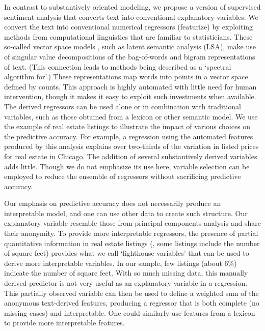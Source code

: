 \documentclass[12pt]{article}
\begin{document}
 In contrast to substantively oriented modeling, we propose a version of supervised
 sentiment analysis that converts text into conventional explanatory variables.
 We convert the text into conventional numerical regressors (featurize) by exploiting methods from computational linguistics that are familiar to statisticians. These so-called vector space models \citep{turney10}, such as latent semantic analysis (LSA), make use of  singular value decompositions of  the bag-of-words and bigram representations of text. (This connection leads to methods being described as a `spectral algorithm for'.) These representations map words into points in a vector space defined by counts. This approach is highly automated with little need for human intervention, though it makes it easy to exploit such investments when available.  The derived regressors can be used alone or in combination with traditional variables, such as those obtained from a lexicon or other semantic model.  We use the example of real estate listings to illustrate the impact of various  choices on the predictive accuracy.  For example, a regression using the
 automated features produced by this analysis explains over two-thirds of the
 variation in listed prices for real estate in Chicago.  The addition of several
 substantively derived variables adds little.  Though we do not emphasize its
 use here, variable selection can be employed to reduce the ensemble of
 regressors without sacrificing predictive accuracy.


 Our emphasis on predictive accuracy does not necessarily produce an
 interpretable model, and one can use other data to create such structure.  Our
 explanatory variable resemble those from principal components analysis and
 share their anonymity.  To provide more interpretable regressors, the presence
 of partial quantitative information in real estate listings (\eg, some listings
 include the number of square feet) provides what we call ‘lighthouse variables’
 that can be used to derive more interpretable variables.  In our sample, few
 listings (about 6\%) indicate the number of square feet.  With so much missing
 data, this manually derived predictor is not very useful as an explanatory
 variable in a regression.  This partially observed variable can then be used to
 define a weighted sum of the anonymous text-derived features, producing a
 regressor that is both complete (no missing cases) and interpretable.  One
 could similarly use features from a lexicon to provide more interpretable
 features.
\end{document}
